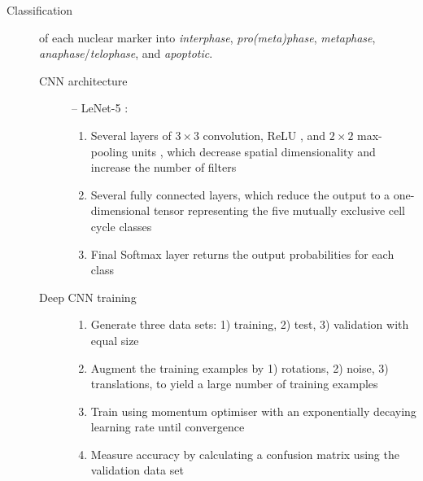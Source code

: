 \documentclass[a4paper,11pt]{article}
\begin{document}
\begin{description}
    \item[Classification] of each nuclear marker into \textit{interphase}, \textit{pro(meta)phase}, \textit{metaphase}, \textit{anaphase}/\textit{telophase}, and \textit{apoptotic}.
    \begin{description}
        \item[CNN architecture] -- LeNet-5 \cite{lecun1998gradient,lecun2015lenet}: 
        \begin{enumerate}
            \item Several layers of $3\times3$ convolution, ReLU \cite{nair2010rectified}, and $2\times2$ max-pooling units \cite{scherer2010evaluation}, which decrease spatial dimensionality and increase the number of filters
            \item Several fully connected layers, which reduce the output to a one-dimensional tensor representing the five mutually exclusive cell cycle classes
            \item Final Softmax layer returns the output probabilities for each class
        \end{enumerate}
        \item[Deep CNN training] \mbox{}
        \begin{enumerate}
            \item Generate three data sets: 1) training, 2) test, 3) validation with equal size
            \item Augment the training examples by 1) rotations, 2) noise, 3) translations, to yield a large number of training examples
            \item Train using momentum optimiser with an exponentially decaying learning rate until convergence
            \item Measure accuracy by calculating a confusion matrix using the validation data set
        \end{enumerate}
    \end{description}
    

\end{description}
\end{document}

